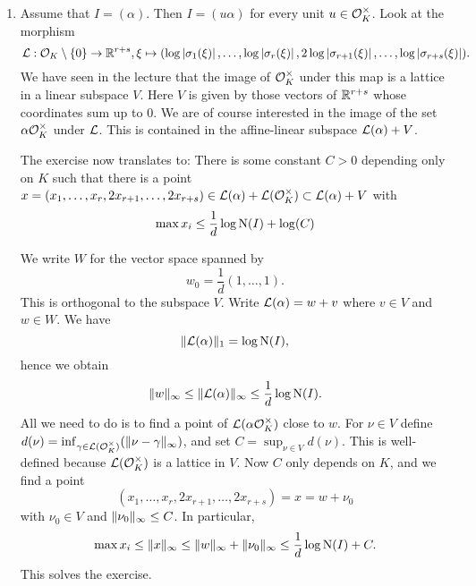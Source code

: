 \documentclass[a4paper,11pt]{article}
\begin{document}
\begin{enumerate}[wide, labelindent=0pt]
    \item Assume that $I = (\alpha)$.
        Then $I = (u \alpha)$ for every unit $u \in \mathcal{O}_K^\times$. Look at the morphism
        \begin{equation*}
            \mathcal{L}: \mathcal{O}_K\setminus \{0\} \to \mathbb{R}^{r+s}, 
            \xi \mapsto (\log \left\lvert \sigma_1(\xi) \right\rvert, \dots, \log \left\lvert \sigma_r(\xi) \right\rvert, 
            2\log \left\lvert \sigma_{r+1}(\xi) \right\rvert, \dots, \log \left\lvert \sigma_{r+s}(\xi) \right\rvert).
        \end{equation*}
        We have seen in the lecture that the image of $\mathcal{O}_K^\times$ under this map 
        is a lattice in a linear subspace $V$. Here $V$ is given by those vectors
        of $\mathbb{R}^{r+s}$ whose coordinates sum up to $0$. We are of course interested
        in the image of the set $\alpha \mathcal{O}_K^\times$ under $\mathcal{L}$. This is contained
        in the affine-linear subspace $\mathcal{L}(\alpha) + V$. 
        
        The exercise now translates to: There is some constant $C > 0$ depending only
        on $K$ such that there is a point $x = (x_1, \dots, x_r, 2x_{r+1}, \dots,
        2x_{r+s}) \in \mathcal{L}(\alpha) + \mathcal{L}(\mathcal{O}_K^\times) \subset \mathcal{L}(\alpha)+V$ with 
        \begin{equation*}
             \max x_i \leq \frac 1d \log \operatorname{N}(I) + \log(C)
        \end{equation*}

        We write $W$ for the vector space spanned by 
        \begin{equation*}
            w_0 = \frac 1d (1,\dots,1).
        \end{equation*}
        This is orthogonal to the subspace $V$. Write $\mathcal{L}(\alpha) = w + v$ where
        $v \in V$ and $w \in W$. We have 
        \begin{equation*}
            \lVert\mathcal{L}(\alpha)\rVert_1 = \log \operatorname{N}(I),
        \end{equation*}
        hence we obtain 
        $$\lVert w\rVert_\infty \leq \lVert\mathcal{L}(\alpha)\rVert_\infty \leq \frac 1d \log \operatorname{N}(I).$$
        All we need to do is to find a point of $\mathcal{L}(\alpha \mathcal{O}_K^\times)$
        close to $w$. For $\nu \in V$ define $d(\nu) = \inf_{\gamma \in \mathcal{L}(\mathcal{O}_K^\times)}
        (\lVert\nu-\gamma\rVert_\infty)$, and set $C = \sup_{\nu \in V} d(\nu)$. This 
        is well-defined because $\mathcal{L}(\mathcal{O}_K^\times)$ is a lattice in $V$.
        Now $C$ only depends on $K$, and we find a point 
        $$(x_1,\dots, x_r, 2x_{r+1},\dots, 2x_{r+s}) = x = w + \nu_0$$
        with $\nu_0 \in V$ and $\lVert\nu_0\rVert_\infty \leq C$. In particular,
        \begin{equation*}
        \max x_i \leq \lVert x\rVert_\infty \leq \lVert w\rVert_\infty + \lVert\nu_0\rVert_\infty \leq
        \frac 1d \log \operatorname{N}(I) + C.
        \end{equation*}
        This solves the exercise.
        

\end{enumerate}
\end{document}
